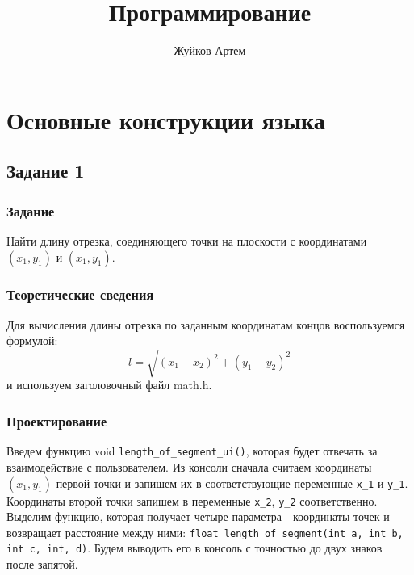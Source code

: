 \documentclass[12pt,a4paper]{report}
\author{Жуйков Артем}
\title{Программирование}
\begin{document}
\listoftodos
\maketitle
\chapter{Основные конструкции языка}
\section{Задание 1}
\subsection{Задание}
Найти длину отрезка, соединяющего точки на плоскости с координатами $(x_1, y_1)$ и $(x_1 , y_1)$.

\subsection{Теоретические сведения}


Для вычисления длины отрезка по заданным координатам концов воспользуемся формулой:
\begin{equation}
l = \sqrt{(x_1 - x_2)^2 + (y_1 - y_2)^2}
\end{equation}
и используем заголовочный файл math.h.

\subsection{Проектирование}
Введем функцию void \verb+length_of_segment_ui()+, которая будет отвечать за взаимодействие с пользователем. Из консоли сначала считаем координаты $ (x_1, y_1) $ первой точки и запишем их в соответствующие переменные \verb+х_1+ и \verb+у_1+.
Координаты второй точки запишем в переменные \verb+x_2+, \verb+y_2+ соответственно.
Выделим функцию, которая получает четыре параметра - координаты точек и возвращает расстояние между ними: \verb+float length_of_segment(int a, int b, int c, int, d)+. Будем выводить его в консоль с точностью до двух знаков после запятой.
\end{document}
